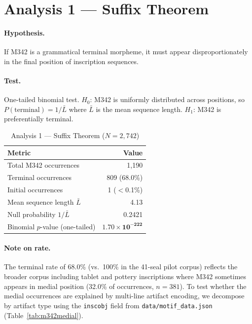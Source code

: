 \documentclass[12pt,letterpaper]{article}
\begin{document}
\section{Analysis 1 --- Suffix Theorem}
\label{sec:analysis1}

\paragraph{Hypothesis.}
If M342 is a grammatical terminal morpheme, it must appear
disproportionately in the final position of inscription sequences.

\paragraph{Test.}
One-tailed binomial test.
$H_0$: M342 is uniformly distributed across positions, so
$P(\text{terminal}) = 1/\bar{L}$ where $\bar{L}$ is the mean
sequence length.
$H_1$: M342 is preferentially terminal.

\begin{table}[htbp]
\centering
\caption{Analysis 1 --- Suffix Theorem ($N = 2{,}742$)}
\begin{tabular}{lr}
\toprule
Metric & Value \\
\midrule
Total M342 occurrences          & 1,190 \\
Terminal occurrences            & 809 \quad (68.0\%) \\
Initial occurrences             & 1 \quad ($<$0.1\%) \\
Mean sequence length $\bar{L}$  & 4.13 \\
Null probability $1/\bar{L}$    & 0.2421 \\
Binomial $p$-value (one-tailed) & $\mathbf{1.70 \times 10^{-222}}$ \\
\midrule
\bottomrule
\end{tabular}
\end{table}

\paragraph{Note on rate.}
The terminal rate of 68.0\% (vs.\ 100\% in the 41-seal pilot corpus)
reflects the broader corpus including tablet and pottery inscriptions
where M342 sometimes appears in medial position (32.0\% of occurrences,
$n = 381$).
To test whether the medial occurrences are explained by multi-line
artifact encoding, we decompose by artifact type using the
\texttt{inscobj} field from \texttt{data/motif\_data.json}
(Table~\ref{tab:m342medial}).
\end{document}
